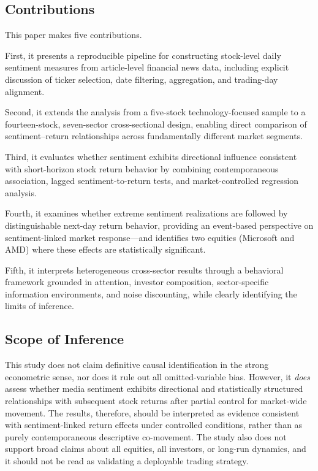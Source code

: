 \documentclass[lettersize,journal]{IEEEtran}
\begin{document}
\subsection{Contributions}
This paper makes five contributions.

First, it presents a reproducible pipeline for constructing stock-level daily sentiment measures from article-level financial news data, including explicit discussion of ticker selection, date filtering, aggregation, and trading-day alignment.

Second, it extends the analysis from a five-stock technology-focused sample to a fourteen-stock, seven-sector cross-sectional design, enabling direct comparison of sentiment--return relationships across fundamentally different market segments.

Third, it evaluates whether sentiment exhibits directional influence consistent with short-horizon stock return behavior by combining contemporaneous association, lagged sentiment-to-return tests, and market-controlled regression analysis.

Fourth, it examines whether extreme sentiment realizations are followed by distinguishable next-day return behavior, providing an event-based perspective on sentiment-linked market response---and identifies two equities (Microsoft and AMD) where these effects are statistically significant.

Fifth, it interprets heterogeneous cross-sector results through a behavioral framework grounded in attention, investor composition, sector-specific information environments, and noise discounting, while clearly identifying the limits of inference.

\subsection{Scope of Inference}
This study does not claim definitive causal identification in the strong econometric sense, nor does it rule out all omitted-variable bias. However, it \textit{does} assess whether media sentiment exhibits directional and statistically structured relationships with subsequent stock returns after partial control for market-wide movement. The results, therefore, should be interpreted as evidence consistent with sentiment-linked return effects under controlled conditions, rather than as purely contemporaneous descriptive co-movement. The study also does not support broad claims about all equities, all investors, or long-run dynamics, and it should not be read as validating a deployable trading strategy.
\end{document}
